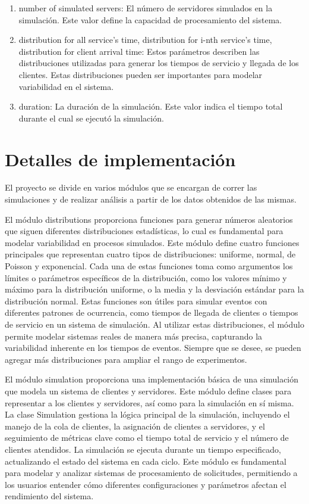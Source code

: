 \documentclass[12pt]{article}
\begin{document}
\begin{enumerate}
\item number of simulated servers: El número de servidores simulados en la simulación. Este valor define la capacidad de procesamiento del sistema.
\item distribution for all service's time, distribution for i-nth service's time, distribution for client arrival time: Estos parámetros describen las distribuciones utilizadas para generar los tiempos de servicio y llegada de los clientes. Estas distribuciones pueden ser importantes para modelar variabilidad en el sistema.
\item duration: La duración de la simulación. Este valor indica el tiempo total durante el cual se ejecutó la simulación.

\end{enumerate}

\section{Detalles de implementación}

El proyecto se divide en varios módulos que se encargan de correr las simulaciones y de realizar análisis a partir de los datos obtenidos de las mismas.

El módulo distributions proporciona funciones para generar números aleatorios que siguen diferentes distribuciones estadísticas, lo cual es fundamental para modelar variabilidad en procesos simulados. Este módulo define cuatro funciones principales que representan cuatro tipos de distribuciones: uniforme, normal, de Poisson y exponencial. Cada una de estas funciones toma como argumentos los límites o parámetros específicos de la distribución, como los valores mínimo y máximo para la distribución uniforme, o la media y la desviación estándar para la distribución normal. Estas funciones son útiles para simular eventos con diferentes patrones de ocurrencia, como tiempos de llegada de clientes o tiempos de servicio en un sistema de simulación. Al utilizar estas distribuciones, el módulo permite modelar sistemas reales de manera más precisa, capturando la variabilidad inherente en los tiempos de eventos. Siempre que se desee, se pueden agregar más distribuciones para ampliar el rango de experimentos.

El módulo simulation proporciona una implementación básica de una simulación que modela un sistema de clientes y servidores. Este módulo define clases para representar a los clientes y servidores, así como para la simulación en sí misma. La clase Simulation gestiona la lógica principal de la simulación, incluyendo el manejo de la cola de clientes, la asignación de clientes a servidores, y el seguimiento de métricas clave como el tiempo total de servicio y el número de clientes atendidos. La simulación se ejecuta durante un tiempo especificado, actualizando el estado del sistema en cada ciclo. Este módulo es fundamental para modelar y analizar sistemas de procesamiento de solicitudes, permitiendo a los usuarios entender cómo diferentes configuraciones y parámetros afectan el rendimiento del sistema.
\end{document}
